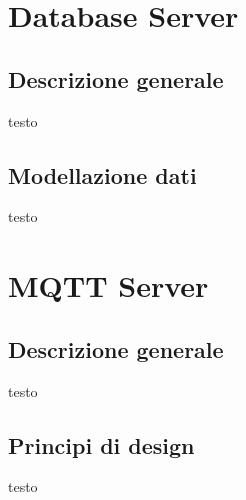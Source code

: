 \section{Database Server}
\subsection{Descrizione generale}
testo
\subsection{Modellazione dati}
testo

\section{MQTT Server}
\subsection{Descrizione generale}
testo
\subsection{Principi di design}
testo


